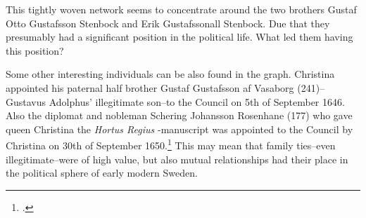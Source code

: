 This tightly woven network seems to concentrate around the two brothers Gustaf Otto Gustafsson Stenbock and Erik Gustafssonall Stenbock. Due that they presumably had a significant position in the political life. What led them having this position?

Some other interesting individuals can be also found in the graph. Christina appointed his paternal half brother Gustaf Gustafsson af Vasaborg (241)–Gustavus Adolphus' illegitimate son–to the Council on 5th of September 1646. Also the diplomat and nobleman Schering Johansson Rosenhane (177) who gave queen Christina the \textit{Hortus Regius} -manuscript was appointed to the Council by Christina on 30th of September 1650.\footcite{councillorsDS} This may mean that family ties–even illegitimate–were of high value, but also mutual relationships had their place in the political sphere of early modern Sweden.
